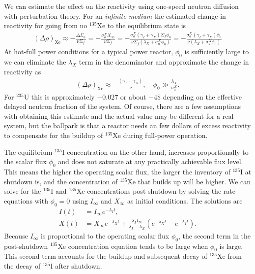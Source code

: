 We can estimate the effect on the reactivity using one-speed neutron diffusion with perturbation theory. For an \emph{infinite medium} the estimated change in reactivity for going from no $^{135}$Xe to the equilibrium state is
\begin{align}
  (\Delta \rho)_\text{Xe} \approx -\frac{ \Delta \Sigma_a }{ \nu \Sigma_f } = -\frac{ \sigma_a^X X_\infty }{ \nu \Sigma_f } =  -\frac{ \sigma_a^X ( \gamma_I + \gamma_X ) \Sigma_f \phi_0 }{ \nu \Sigma_f ( \lambda_X + \sigma_a^X \phi_0 )  } = -\frac{ \sigma_a^X ( \gamma_I + \gamma_X ) \phi_0 }{ \nu ( \lambda_X + \sigma_a^X \phi_0 )  }
\end{align}
At hot-full power conditions for a typical power reactor, $\phi_0$ is sufficiently large to we can eliminate the $\lambda_X$ term in the denominator and approximate the change in reactivity as
\begin{align}
  (\Delta \rho)_\text{Xe} \approx  -\frac{ ( \gamma_I + \gamma_X ) }{ \nu  } , \quad   \phi_0 \gg \frac{\lambda_X}{\sigma_a^X} .
\end{align}
For $^{235}$U this is approximately $-0.027$ or about $-4$\$ depending on the effective delayed neutron fraction of the system. Of course, there are a few assumptions with obtaining this estimate and the actual value may be different for a real system, but the ballpark is that a reactor needs an few dollars of excess reactivity to compensate for the buildup of $^{135}$Xe during full-power operation.

The equilibrium $^{135}$I concentration on the other hand, increases proportionally to the scalar flux $\phi_0$ and does not saturate at any practically achievable flux level. This means the higher the operating scalar flux, the larger the inventory of $^{135}$I at shutdown is, and the concentration of $^{135}$Xe that builds up will be higher. We can solve for the $^{135}$I and $^{135}$Xe concentrations post shutdown by solving the rate equations with $\phi_0 = 0$ using $I_\infty$ and $X_\infty$ as initial conditions. The solutions are
\begin{subequations}
\begin{align}
  I(t) &= I_\infty e^{-\lambda_I t}, \\
  X(t) &= X_\infty e^{-\lambda_X t} + \frac{ \lambda_I I_\infty }{ \lambda_I - \lambda_X } \left( e^{-\lambda_X t} - e^{-\lambda_I t} \right) .
\end{align}
\end{subequations}
Because $I_\infty$ is proportional to the operating scalar flux $\phi_0$, the second term in the post-shutdown $^{135}$Xe concentration equation tends to be large when $\phi_0$ is large. This second term accounts for the buildup and subsequent decay of $^{135}$Xe from the decay of $^{135}$I after shutdown.

